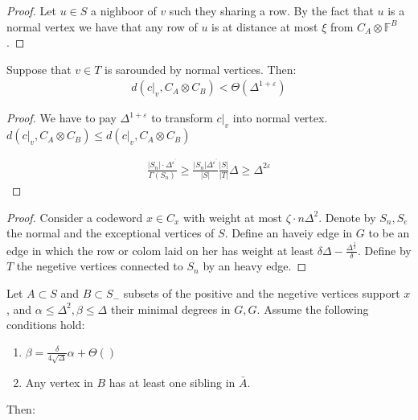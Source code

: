  \begin{proof}
   Let $u \in S$ a nighboor of $v$ such they sharing a row. By the fact that $u$ is a normal vertex we have that any row of $u$ is at distance at most $\xi$ from $C_{A} \otimes \mathbb{F}^{B}$.     
 \end{proof}
\begin{claim}
  Suppose that $v \in T$ is sarounded by normal vertices. Then:
  \begin{equation*}
    \begin{split}
      d\left( c|_{v}, C_{A}\otimes C_{B}\right) < \Theta\left( \Delta^{1+\varepsilon} \right)
    \end{split}
  \end{equation*} 
 \end{claim}
\begin{proof}
  We have to pay $\Delta^{1+\varepsilon}$ to transform $c|_{v}$ into normal vertex. 
    $ d\left( c|_{v}, C_{A}\otimes C_{B}\right) \le d\left( c|_{v}, C_{A}\otimes C_{B}\right) $

    \begin{equation*}
      \begin{split}
        \frac{|S_{n}|\cdot \Delta^{\varepsilon^\prime}}{\Gamma\left( S_{n} \right)} \ge \frac{|S_{n}|\Delta^{\varepsilon^{\prime}}}{|S|} \frac{|S|}{|T|}\Delta \ge \Delta^{2\varepsilon}
      \end{split}
    \end{equation*}
 \end{proof}
 
 \begin{remark}
 \end{remark}

 \begin{proof}
   Consider a codeword $x \in C_{x}$ with weight at most $\zeta \cdot n\Delta^{2} $. Denote by $S_{n}, S_{e}$ the normal and the exceptional vertices of $S$. Define an haveiy edge in $G$ to be an edge in which the row or colom laid on her has weight at least $\delta\Delta - \frac{\Delta^{\frac{1}{2}}}{\delta}$. Define by $T$ the negetive vertices connected to $S_{n}$ by an heavy edge.     
 \end{proof}
 
 \begin{claim}  
   \label{cliam:tech} Let $A \subset S$ and $B \subset S_{-}$ subsets of the positive and the negetive vertices support $x$, and $\alpha \le \Delta^{2},\beta \le \Delta$ their minimal degrees in $G, G$. Assume the following conditions hold:
   \begin{enumerate}
     \item $\beta = \frac{\delta}{4 \sqrt{\Delta}}\alpha + \Theta\left(  \right)$
     \item Any vertex in $B$ has at least one sibling in $\bar{A}$.
   \end{enumerate}
   Then:
 \end{claim}

